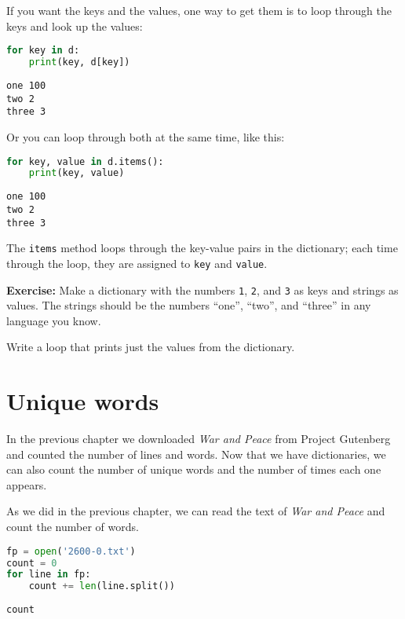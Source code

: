 If you want the keys and the values, one way to get them is to loop
through the keys and look up the values:

\begin{lstlisting}[language=Python]
for key in d:
    print(key, d[key])
\end{lstlisting}

\begin{lstlisting}[]
one 100
two 2
three 3
\end{lstlisting}

Or you can loop through both at the same time, like this:

\begin{lstlisting}[language=Python]
for key, value in d.items():
    print(key, value)
\end{lstlisting}

\begin{lstlisting}[]
one 100
two 2
three 3
\end{lstlisting}

The \passthrough{\lstinline!items!} method loops through the key-value
pairs in the dictionary; each time through the loop, they are assigned
to \passthrough{\lstinline!key!} and \passthrough{\lstinline!value!}.

\textbf{Exercise:} Make a dictionary with the numbers
\passthrough{\lstinline!1!}, \passthrough{\lstinline!2!}, and
\passthrough{\lstinline!3!} as keys and strings as values. The strings
should be the numbers ``one'', ``two'', and ``three'' in any language
you know.

Write a loop that prints just the values from the dictionary.

\hypertarget{unique-words}{%
\section{Unique words}\label{unique-words}}

In the previous chapter we downloaded \emph{War and Peace} from Project
Gutenberg and counted the number of lines and words. Now that we have
dictionaries, we can also count the number of unique words and the
number of times each one appears.

As we did in the previous chapter, we can read the text of \emph{War and
Peace} and count the number of words.

\begin{lstlisting}[language=Python]
fp = open('2600-0.txt')
count = 0
for line in fp:
    count += len(line.split())
    
count
\end{lstlisting}

